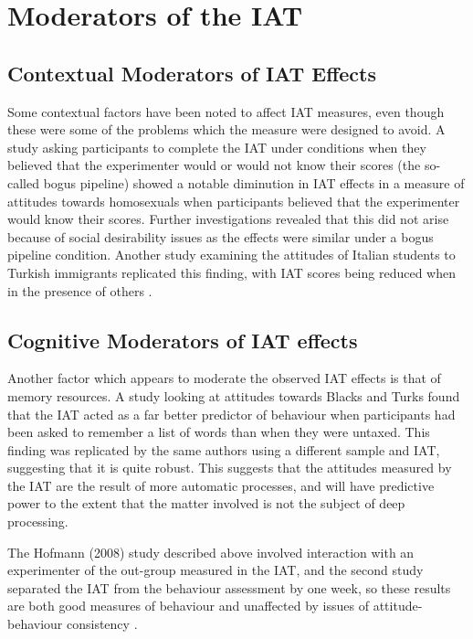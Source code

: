 \section{Moderators of the IAT}
\label{sec:moderators-iat}



\subsection{Contextual Moderators of IAT Effects}
\label{sec:cont-moder-iat}



Some contextual factors have been noted to affect IAT measures, even though these were some of the problems which the measure were designed to avoid. A study asking participants to complete the IAT under conditions when they believed that the experimenter would or would not know their scores (the so-called bogus pipeline) \cite{Boysen2006} showed a notable diminution in IAT effects in a measure of attitudes towards homosexuals when participants believed that the experimenter would know their scores. Further investigations revealed that this did not arise because of social desirability issues as the effects were similar under a bogus pipeline condition. Another study examining the attitudes of Italian students to Turkish immigrants replicated this finding, with IAT scores being reduced when in the presence of others \cite{Castelli2008}. 

\subsection{Cognitive Moderators of IAT effects}
\label{sec:cogn-moder-iat}



Another factor which appears to moderate the observed IAT effects is that of memory resources. A study looking at attitudes towards Blacks and Turks \cite{Hofmann2008a} found that the IAT acted as a far better predictor of behaviour when participants had been asked to remember a list of words than when they were untaxed. This finding was replicated by the same authors using a different sample and IAT, suggesting that it is quite robust.  This suggests that the attitudes measured by the IAT are the result of more automatic processes, and will have predictive power to the extent that the matter involved is not the subject of deep processing. 

The Hofmann (2008) study described above involved interaction with an experimenter of the out-group measured in the IAT, and the second study separated the IAT from the behaviour assessment by one week, so these results are both good measures of behaviour and unaffected by  issues of attitude-behaviour consistency . 

